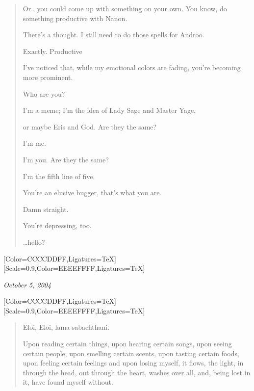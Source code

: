 \begin{paracol}{2}
\begin{leftcolumn}
\begin{quotation}
\begin{ally}
Or.. you could come up with something on your own. You know, do something productive with Nanon.
\end{ally}
There's a thought. I still need to do those spells for Androo.

\begin{ally}
Exactly. Productive
\end{ally}
I've noticed that, while my emotional colors are fading, you're becoming more prominent.

Who are you?

\begin{ally}
I'm a meme; I'm the idea of Lady Sage and Master Yage,
\end{ally}
\begin{ally}
or maybe Eris and God. Are they the same?
\end{ally}
\begin{ally}
I'm me.
\end{ally}
\begin{ally}
I'm you. Are they the same?
\end{ally}
\begin{ally}
I'm the fifth line of five.
\end{ally}
You're an elusive bugger, that's what you are.

\begin{ally}
Damn straight.
\end{ally}
You're depressing, too.

\vspace{2\baselineskip}

\noindent\ldots{}hello?
\end{quotation}
\newpage
\end{leftcolumn}
\begin{rightcolumn*}
  [Color=CCCCDDFF,Ligatures=TeX]
  \renewfontfamily{}[Scale=0.9,Color=EEEEFFFF,Ligatures=TeX]
\begin{flushright}
    \emph{October 5, 2004}
\end{flushright}
\end{rightcolumn*}
\begin{leftcolumn}
  [Color=CCCCDDFF,Ligatures=TeX]
  \renewfontfamily{}[Scale=0.9,Color=EEEEFFFF,Ligatures=TeX]
\begin{quotation}
\noindent Eloi, Eloi, lama sabachthani.

Upon reading certain things, upon hearing certain songs, upon seeing certain people, upon smelling certain scents, upon tasting certain foods, upon feeling certain feelings and upon losing myself, it flows, the light, in through the head, out through the heart, washes over all, and, being lost in it, have found myself without.


\end{quotation}
\end{leftcolumn}
\end{paracol}
